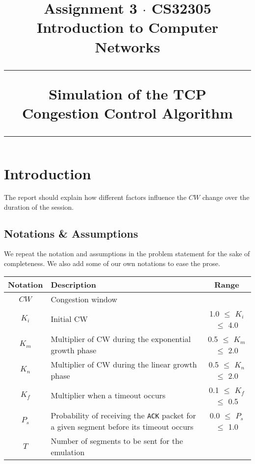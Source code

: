 \documentclass[12pt]{article}
\title{
    \Large Assignment 3 $\cdot$ CS32305 \\
    \Large Introduction to Computer Networks
    \rule[8pt]{\textwidth}{0.3pt}
    \LARGE Simulation of the TCP \\ Congestion Control Algorithm 
    \rule{\textwidth}{0.3pt}
}
\begin{document}
\maketitle

\newpage

\section*{Introduction}

The report should explain how different factors influence the $CW$ change over the duration of the session.

\subsection*{Notations \& Assumptions}

We repeat the notation and assumptions in the problem statement for the sake of completeness. We also add some of our own notations to ease the prose.

\vspace*{8pt}

\noindent\begin{tabular}{|c|p{}|c|}
    \hline
    \textbf{Notation} & \textbf{Description}                                                                           & \textbf{Range}            \\
    \hline
    $CW$              & Congestion window                                                                              &                           \\
    \hline
    $K_i$             & Initial CW                                                                                     & 1.0 $\le$ $K_i$ $\le$ 4.0 \\
    \hline
    $K_m$             & Multiplier of CW during the exponential growth phase                                           & 0.5 $\le$ $K_m$ $\le$ 2.0 \\
    \hline
    $K_n$             & Multiplier of CW during the linear growth phase                                                & 0.5 $\le$ $K_n$ $\le$ 2.0 \\
    \hline
    $K_f$             & Multiplier when a timeout occurs                                                               & 0.1 $\le$ $K_f$ $\le$ 0.5 \\
    \hline
    $P_s$             & Probability of receiving the \texttt{ACK} packet for a given segment before its timeout occurs & 0.0 $\le$ $P_s$ $\le$ 1.0 \\
    \hline
    $T$               & Number of segments to be sent for the emulation                                                &                           \\
    \hline
\end{tabular}
\end{document}
